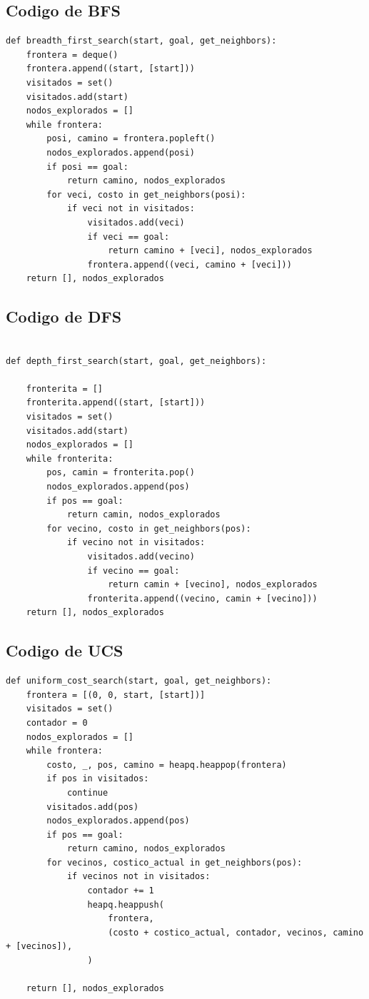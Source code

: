 \subsection{Codigo de BFS}
\begin{lstlisting}
def breadth_first_search(start, goal, get_neighbors):
	frontera = deque()
	frontera.append((start, [start]))
	visitados = set()
	visitados.add(start)
	nodos_explorados = []
	while frontera:
		posi, camino = frontera.popleft()
		nodos_explorados.append(posi)
		if posi == goal:
			return camino, nodos_explorados
		for veci, costo in get_neighbors(posi):
			if veci not in visitados:
				visitados.add(veci)
				if veci == goal:
					return camino + [veci], nodos_explorados
				frontera.append((veci, camino + [veci]))
	return [], nodos_explorados
\end{lstlisting}


\subsection{Codigo de DFS}

\begin{lstlisting}

def depth_first_search(start, goal, get_neighbors):

    fronterita = []
    fronterita.append((start, [start]))
    visitados = set()
    visitados.add(start)
    nodos_explorados = []
    while fronterita:
        pos, camin = fronterita.pop()
        nodos_explorados.append(pos)
        if pos == goal:
            return camin, nodos_explorados
        for vecino, costo in get_neighbors(pos):
            if vecino not in visitados:
                visitados.add(vecino)
                if vecino == goal:
                    return camin + [vecino], nodos_explorados
                fronterita.append((vecino, camin + [vecino]))
    return [], nodos_explorados
\end{lstlisting}

\subsection{Codigo de UCS}

\begin{lstlisting}
def uniform_cost_search(start, goal, get_neighbors):
    frontera = [(0, 0, start, [start])]
    visitados = set()
    contador = 0
    nodos_explorados = []
    while frontera:
        costo, _, pos, camino = heapq.heappop(frontera)
        if pos in visitados:
            continue
        visitados.add(pos)
        nodos_explorados.append(pos)
        if pos == goal:
            return camino, nodos_explorados
        for vecinos, costico_actual in get_neighbors(pos):
            if vecinos not in visitados:
                contador += 1
                heapq.heappush(
                    frontera,
                    (costo + costico_actual, contador, vecinos, camino + [vecinos]),
                )

    return [], nodos_explorados
\end{lstlisting}

